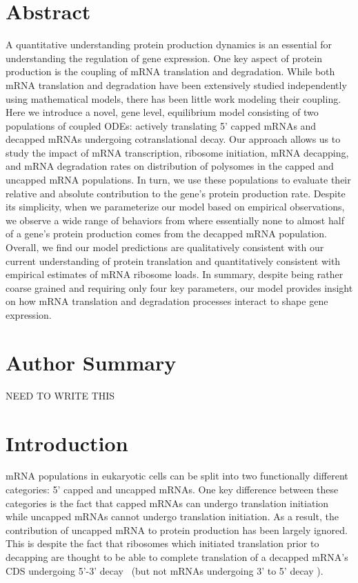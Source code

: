 \documentclass[10pt,letterpaper]{article}
\begin{document}
\section*{Abstract}
A quantitative understanding protein production dynamics is an essential for understanding the regulation of gene expression.
One key aspect of protein production is the coupling of mRNA translation and degradation.
While both mRNA translation and degradation have been extensively studied independently using mathematical models, there has been little work modeling their coupling.
Here we introduce a novel, gene level, equilibrium model consisting of two populations of coupled ODEs: actively translating 5' capped mRNAs and decapped mRNAs undergoing cotranslational decay.
Our approach allows us to study the impact of mRNA transcription, ribosome initiation, mRNA decapping, and mRNA degradation rates on distribution of polysomes in the capped and uncapped mRNA populations.
In turn, we use these populations to evaluate their relative and absolute contribution to the gene's protein production rate.
Despite its simplicity, when we parameterize our model based on empirical observations, we observe a wide range of behaviors from where essentially none to almost half of a gene's protein production comes from the decapped mRNA population.
Overall, we find our model predictions are qualitatively consistent with our current understanding of protein translation and quantitatively consistent with empirical estimates of mRNA ribosome loads.
In summary, despite being rather coarse grained and requiring only four key parameters, our model provides insight on how mRNA translation and degradation processes interact to shape gene expression.

% 


\section*{Author Summary}

NEED TO WRITE THIS



\linenumbers

\section*{Introduction}

mRNA populations in eukaryotic cells can be split into two functionally different categories: 5' capped and uncapped mRNAs.
One key difference between these categories is the fact that capped mRNAs can undergo translation initiation while uncapped mRNAs cannot undergo translation initiation.
As a result, the contribution of uncapped mRNA to protein production has been largely ignored.
This is despite the fact that ribosomes which initiated translation prior to decapping are thought to be able to complete translation of a decapped mRNA's CDS undergoing 5'-3' decay~\cite{RN3,RN4} (but not mRNAs undergoing 3' to 5' decay \cite{RN5}).
\end{document}
